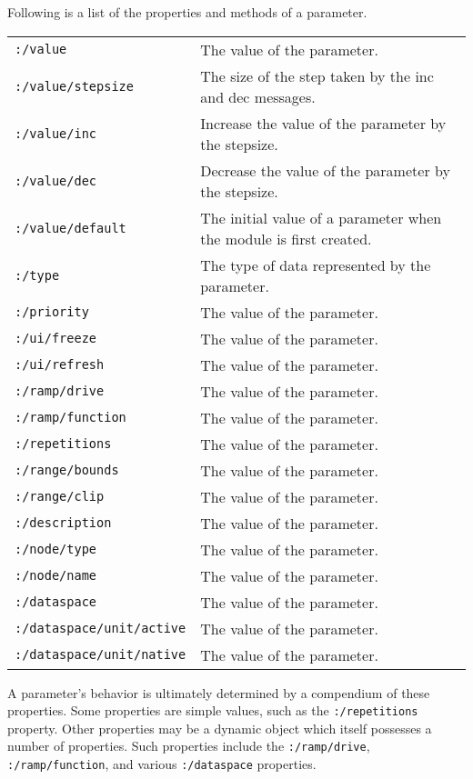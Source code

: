 \documentclass{article}
\begin{document}

Following is a list of the properties and methods of a parameter.
\begin{center} 
{\footnotesize
\begin{tabular}{ll}
	\texttt{:/value} & The value of the parameter. \\
	\texttt{:/value/stepsize} & The size of the step taken by the inc and dec messages. \\
	\texttt{:/value/inc} & Increase the value of the parameter by the stepsize. \\
	\texttt{:/value/dec} & Decrease the value of the parameter by the stepsize. \\
	\texttt{:/value/default} & The initial value of a parameter when the module is first created. \\
	\texttt{:/type} & The type of data represented by the parameter. \\
	\texttt{:/priority} & The value of the parameter. \\
	\texttt{:/ui/freeze} & The value of the parameter. \\
	\texttt{:/ui/refresh} & The value of the parameter. \\
	\texttt{:/ramp/drive} & The value of the parameter. \\
	\texttt{:/ramp/function} & The value of the parameter. \\
	\texttt{:/repetitions} & The value of the parameter. \\
	\texttt{:/range/bounds} & The value of the parameter. \\
	\texttt{:/range/clip} & The value of the parameter. \\
	\texttt{:/description} & The value of the parameter. \\
	\texttt{:/node/type} & The value of the parameter. \\
	\texttt{:/node/name} & The value of the parameter. \\
	\texttt{:/dataspace} & The value of the parameter. \\
	\texttt{:/dataspace/unit/active} & The value of the parameter. \\
	\texttt{:/dataspace/unit/native} & The value of the parameter. \\
\end{tabular} } 
\end{center}  

A parameter's behavior is ultimately determined by a compendium of these properties. Some properties are simple values, such as the \texttt{:/repetitions} property. Other properties may be a dynamic object which itself possesses a number of properties.  Such properties include the \texttt{:/ramp/drive}, \texttt{:/ramp/function}, and various \texttt{:/dataspace} properties.
\end{document}
